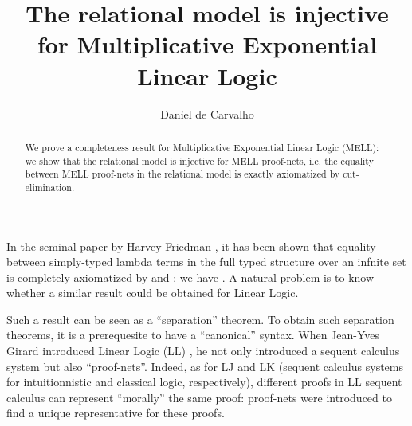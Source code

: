 \documentclass{article}
\title{The relational model is injective for Multiplicative Exponential Linear Logic}
\author{Daniel de Carvalho}
\theoremstyle{plain}
\begin{document}
\maketitle

\begin{abstract}
We prove a completeness result for Multiplicative Exponential Linear Logic (MELL): we show that the relational model is injective for MELL proof-nets, i.e. the equality between MELL proof-nets in the relational model is exactly axiomatized by cut-elimination.
\end{abstract}



In the seminal paper by Harvey Friedman \cite{Friedman}, it has been shown that equality between simply-typed lambda terms in the full typed structure  over an infnite set  is completely axiomatized by  and : we have . A natural problem is to know whether a similar result could be obtained for Linear Logic. 

Such a result can be seen as a ``separation'' theorem. To obtain such separation theorems, it is a prerequesite to have a ``canonical'' syntax. 
When Jean-Yves Girard introduced Linear Logic (LL) \cite{ll}, he not only introduced a sequent calculus system but also ``proof-nets''. Indeed, as for LJ and LK (sequent calculus systems for intuitionnistic and classical logic, respectively), different proofs in LL sequent calculus can represent ``morally'' the same proof: proof-nets were introduced to find a unique representative for these proofs. 
\end{document}
